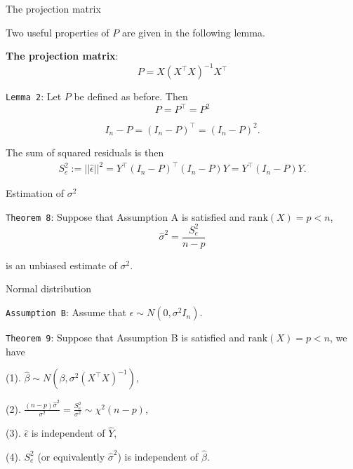 \documentclass[ignorenonframetext,]{beamer}
\begin{document}
\begin{frame}[fragile]{The projection matrix}
\protect\hypertarget{the-projection-matrix}{}

Two useful properties of \(P\) are given in the following lemma.

\textbf{The projection matrix}: \[P = X(X^\top X)^{-1}X^\top\]

\texttt{Lemma\ 2}: Let \(P\) be defined as before. Then
\[P = P^\top=P^2\]

\[I_n-P = (I_n-P)^\top=(I_n-P)^2.\]

The sum of squared residuals is then \[
\begin{align}
S_e^2 := ||\hat \epsilon||^2 = Y^\top(I_n-P)^\top(I_n-P)Y=Y^\top(I_n-P)Y.
\end{align}
\]

\end{frame}

\begin{frame}[fragile]{Estimation of \(\sigma^2\)}
\protect\hypertarget{estimation-of-sigma2-2}{}

\texttt{Theorem\ 8}: Suppose that Assumption A is satisfied and
\(\mathrm{rank}(X)=p<n\), \[\hat\sigma^2 = \frac{S_e^2}{n-p}\]

is an unbiased estimate of \(\sigma^2\).

\end{frame}

\begin{frame}[fragile]{Normal distribution}
\protect\hypertarget{normal-distribution}{}

\texttt{Assumption\ B}: Assume that \(\epsilon\sim N(0,\sigma^2I_n)\).

\texttt{Theorem\ 9}: Suppose that Assumption B is satisfied and
\(\mathrm{rank}(X)=p<n\), we have

(1). \(\hat\beta \sim N(\beta, \sigma^2(X^\top X)^{-1})\),

(2).
\(\frac{(n-p)\hat\sigma^2}{\sigma^2}=\frac{S_e^2}{\sigma^2}\sim \chi^2(n-p)\),

(3). \(\hat\epsilon\) is independent of \(\hat Y\),

(4). \(S_e^2\) (or equivalently \(\hat\sigma^2\)) is independent of
\(\hat\beta\).

\end{frame}
\end{document}
